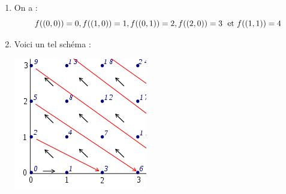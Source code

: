\documentclass[a4paper,10pt]{report}
\begin{document}
\corr 
\begin{enumerate}
\item On a :
$$ f((0,0)) = 0,f((1,0))=1, f((0,1))= 2, f((2,0))=3 \; \hbox{ et } f((1,1))=4$$

\item Voici un tel schéma : 

\begin{center}
\includegraphics[scale=0.5]{den}
\end{center}


\end{enumerate}
\end{document}

